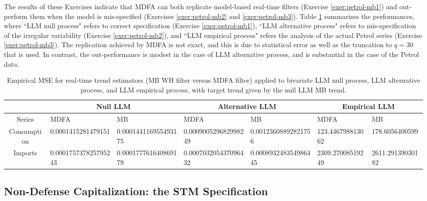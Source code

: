 \documentclass[a4paper]{book}
\begin{document}
 The results of these Exercises   indicate that MDFA can both replicate model-based real-time
  filters (Exercise \ref{exer:petrol-mb1}) and out-perform them when
   the model is mis-specified (Exercises \ref{exer:petrol-mb2} and 
 \ref{exer:petrol-mb3}). Table \ref{tab:petrol.mat} summarizes the performances,
  where ``LLM null process" refers to correct specification (Exercise \ref{exer:petrol-mb1}),
  ``LLM alternative process" refers to mis-specification of the irregular variability
   (Exercise \ref{exer:petrol-mb2}), and ``LLM empirical process" refers
   the analysis of the actual Petrol series (Exercise \ref{exer:petrol-mb3}).
   The replication achieved by MDFA is not exact, and this is due to statistical
    error as well as the truncation to $q = 30$ that is used.  In contrast,
   the out-performance is modest in the case of LLM alternative process,
   and is substantial in the case of the Petrol data.
 
 \begin{table}[]
\centering
\caption{Empirical MSE for real-time trend estimators (MB WH filter versus
 MDFA filter) applied to bivariate LLM null process,  LLM alternative process,
 and LLM empirical process,  with target trend
 given by the null LLM MB trend.  }
\label{tab:petrol.mat}
\begin{tabular}{cllllll}
\hline
& \multicolumn{2}{c}{Null LLM} &\multicolumn{2}{c}{Alternative LLM} &
  \multicolumn{2}{c}{Empirical LLM} \\
\hline
  Series 	 &  MDFA    &  MB  &  MDFA    &  MB    &  MDFA    &  MB   \\
  Consumption &   0.0001415281479151 & 0.000144116955493175 & 
    0.000900529682998249  &  0.00123608892821756    &  
    123.446798813062 &   178.6056400599 \\
  Imports	 &   0.000175737825795243 & 0.000177761640869179 & 
    0.000703205437096432  &  0.000893248354986445    &  
    2309.27008519249 &   2611.29139030182 \\
\hline      
\end{tabular}
\end{table}
 
\subsection{Non-Defense Capitalization: the STM Specification}

 
  
\end{document}
